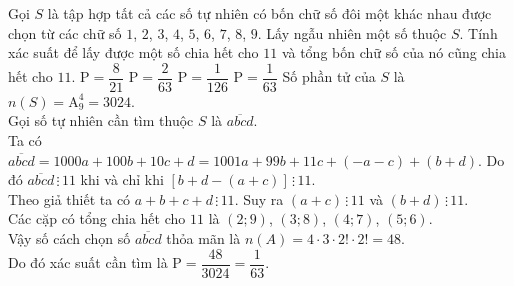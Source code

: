 \begin{ex}%
 Gọi $S$ là tập hợp tất cả các số tự nhiên có bốn chữ số đôi một khác nhau được chọn từ các chữ số $1$, $2$, $3$, $4$, $5$, $6$, $7$, $8$, $9$. Lấy ngẫu nhiên một số thuộc $S$. Tính xác suất để lấy được một số chia hết cho $11$ và tổng bốn chữ số của nó cũng chia hết cho $11$.
 \choice
  {$\mathrm{P} = \dfrac{8}{21}$}
  {$\mathrm{P} = \dfrac{2}{63}$}
  {$\mathrm{P} = \dfrac{1}{126}$}
  {\True $\mathrm{P} = \dfrac{1}{63}$}
 \loigiai
  {
  Số phần tử của $S$ là $n(S) = \mathrm{A}_9^4 = 3024$.\\
  Gọi số tự nhiên cần tìm thuộc $S$ là $\overline{abcd}$.\\
  Ta có $\overline{abcd} = 1000a + 100b + 10c + d = 1001a+ 99b + 11c + (-a-c) + (b+d)$. Do đó $\overline{abcd}\,\vdots\, 11$ khi và chỉ khi $\left[b+d-(a+c)\right]\, \vdots\, 11$.\\
  Theo giả thiết ta có $a+b+c+d \,\vdots\, 11$. Suy ra $(a+c)\, \vdots\, 11$ và $(b+d)\, \vdots\, 11$.\\
  Các cặp có tổng chia hết cho $11$ là $(2;9)$, $(3;8)$, $(4;7)$, $(5;6)$.\\
  Vậy số cách chọn số $\overline{abcd}$ thỏa mãn là $n(A) = 4\cdot 3 \cdot 2! \cdot 2! = 48$.\\
  Do đó xác suất cần tìm là $\mathrm{P} = \dfrac{48}{3024} = \dfrac{1}{63}$.
  }
\end{ex}%
